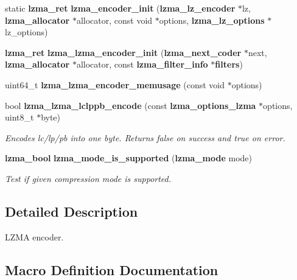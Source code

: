 \begin{DoxyCompactItemize}
\item 
static {\bf lzma\-\_\-ret} {\bfseries lzma\-\_\-encoder\-\_\-init} ({\bf lzma\-\_\-lz\-\_\-encoder} $\ast$lz, {\bf lzma\-\_\-allocator} $\ast$allocator, const void $\ast$options, {\bf lzma\-\_\-lz\-\_\-options} $\ast$lz\-\_\-options)\label{lzma__encoder_8c_a04899e01267d10e72eef6aba9fcdd9da}

\item 
{\bf lzma\-\_\-ret} {\bfseries lzma\-\_\-lzma\-\_\-encoder\-\_\-init} ({\bf lzma\-\_\-next\-\_\-coder} $\ast$next, {\bf lzma\-\_\-allocator} $\ast$allocator, const {\bf lzma\-\_\-filter\-\_\-info} $\ast${\bf filters})\label{lzma__encoder_8c_a0cfb66fbad445488fca8aea70655e528}

\item 
uint64\-\_\-t {\bfseries lzma\-\_\-lzma\-\_\-encoder\-\_\-memusage} (const void $\ast$options)\label{lzma__encoder_8c_a69751f4a64caf8d24a2f94b0301e04c2}

\item 
bool {\bf lzma\-\_\-lzma\-\_\-lclppb\-\_\-encode} (const {\bf lzma\-\_\-options\-\_\-lzma} $\ast$options, uint8\-\_\-t $\ast$byte)
\begin{DoxyCompactList}\small\item\em Encodes lc/lp/pb into one byte. Returns false on success and true on error. \end{DoxyCompactList}\item 
{\bf lzma\-\_\-bool} {\bf lzma\-\_\-mode\-\_\-is\-\_\-supported} ({\bf lzma\-\_\-mode} mode)
\begin{DoxyCompactList}\small\item\em Test if given compression mode is supported. \end{DoxyCompactList}\end{DoxyCompactItemize}


\subsection{Detailed Description}
L\-Z\-M\-A encoder. 

\subsection{Macro Definition Documentation}
